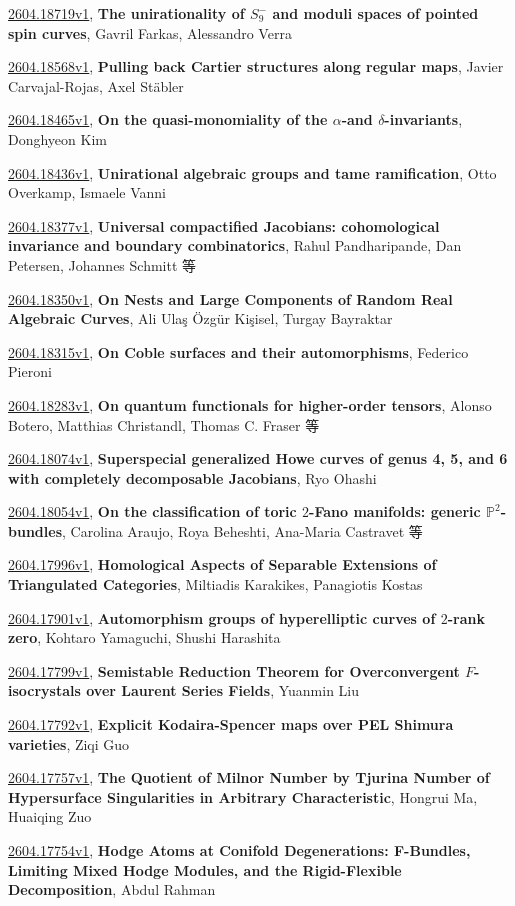 \documentclass[9pt, a4paper]{article}
\theoremstyle{plain}
\theoremstyle{definition}
\theoremstyle{remark}
\newcommand{\arxiv}[3]{\href{https://arxiv.org/abs/#1}{#1}, \textbf{\textcolor{arxivblue}{#2}}, #3}
\begin{document}
\arxiv{2604.18719v1}{The unirationality of $S_9^-$ and moduli spaces of pointed spin curves}{Gavril Farkas, Alessandro Verra}

\arxiv{2604.18568v1}{Pulling back Cartier structures along regular maps}{Javier Carvajal-Rojas, Axel Stäbler}

\arxiv{2604.18465v1}{On the quasi-monomiality of the $α$-and $δ$-invariants}{Donghyeon Kim}

\arxiv{2604.18436v1}{Unirational algebraic groups and tame ramification}{Otto Overkamp, Ismaele Vanni}

\arxiv{2604.18377v1}{Universal compactified Jacobians: cohomological invariance and boundary combinatorics}{Rahul Pandharipande, Dan Petersen, Johannes Schmitt 等}

\arxiv{2604.18350v1}{On Nests and Large Components of Random Real Algebraic Curves}{Ali Ulaş Özgür Kişisel, Turgay Bayraktar}

\arxiv{2604.18315v1}{On Coble surfaces and their automorphisms}{Federico Pieroni}

\arxiv{2604.18283v1}{On quantum functionals for higher-order tensors}{Alonso Botero, Matthias Christandl, Thomas C. Fraser 等}

\arxiv{2604.18074v1}{Superspecial generalized Howe curves of genus 4, 5, and 6 with completely decomposable Jacobians}{Ryo Ohashi}

\arxiv{2604.18054v1}{On the classification of toric $2$-Fano manifolds: generic $\mathbb{P}^2$-bundles}{Carolina Araujo, Roya Beheshti, Ana-Maria Castravet 等}

\arxiv{2604.17996v1}{Homological Aspects of Separable Extensions of Triangulated Categories}{Miltiadis Karakikes, Panagiotis Kostas}

\arxiv{2604.17901v1}{Automorphism groups of hyperelliptic curves of $2$-rank zero}{Kohtaro Yamaguchi, Shushi Harashita}

\arxiv{2604.17799v1}{Semistable Reduction Theorem for Overconvergent $F$-isocrystals over Laurent Series Fields}{Yuanmin Liu}

\arxiv{2604.17792v1}{Explicit Kodaira-Spencer maps over PEL Shimura varieties}{Ziqi Guo}

\arxiv{2604.17757v1}{The Quotient of Milnor Number by Tjurina Number of Hypersurface Singularities in Arbitrary Characteristic}{Hongrui Ma, Huaiqing Zuo}

\arxiv{2604.17754v1}{Hodge Atoms at Conifold Degenerations: F-Bundles, Limiting Mixed Hodge Modules, and the Rigid-Flexible Decomposition}{Abdul Rahman}
\end{document}
